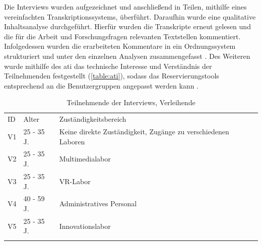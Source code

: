 Die Interviews wurden aufgezeichnet und anschließend in Teilen, mithilfe eines
vereinfachten Transkriptionssystems, überführt. Daraufhin wurde eine qualitative Inhaltsanalyse
durchgeführt. Hierfür wurden die Transkripte erneut gelesen und die für die Arbeit und
Forschungsfragen relevanten Textstellen kommentiert. Infolgedessen wurden die erarbeiteten
Kommentare in ein Ordnungssystem strukturiert und unter den einzelnen Analysen zusammengefasst
\cite{dresing_praxisbuch_2016}. Des Weiteren wurde mithilfe des \ac{ati} das technische Interesse
und Verständnis der Teilnehmenden festgestellt (\ref{table:ati}), sodass das Reservierungstools
entsprechend an die Benutzergruppen angepasst werden kann \cite{attig_assessing_2017}.

\begin{table}[h]
        \centering
        \caption{Teilnehmende der Interviews, Verleihende}
        \begin{tabular}{lll}
                \arrayrulecolor{maincolor}\arrayrulecolor{maincolor}\hline
                \sffamily\color{maincolor}ID & \sffamily\color{maincolor}Alter &
                \sffamily\color{maincolor}Zuständigkeitsbereich                                   \\
                \arrayrulecolor{maincolor}\arrayrulecolor{maincolor}\hline
                V1                           & 25 - 35 J.                      & Keine direkte
                Zuständigkeit, Zugänge zu verschiedenen Laboren                                   \\
                V2                           & 25 - 35 J.                      & Multimedialabor  \\
                V3                           & 25 - 35 J.                      & VR-Labor         \\
                V4                           & 40 - 59 J.                      & Administratives
                Personal                                                                          \\
                V5                           & 25 - 35 J.                      & Innovationslabor \\
                \arrayrulecolor{maincolor}\arrayrulecolor{maincolor}\hline
        \end{tabular}
        \label{table:v}
\end{table}

